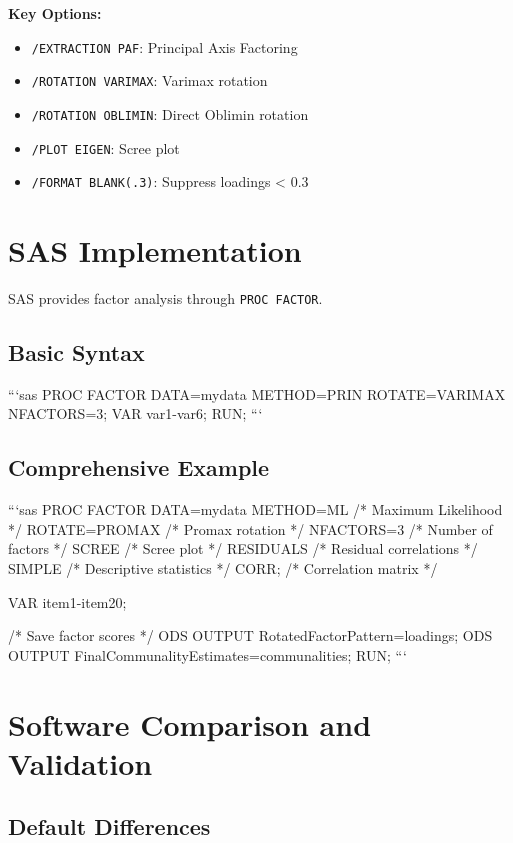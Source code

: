 \documentclass[a4paper]{tufte-book}
\begin{document}
\textbf{Key Options:}
\begin{itemize}
\item \texttt{/EXTRACTION PAF}: Principal Axis Factoring
\item \texttt{/ROTATION VARIMAX}: Varimax rotation
\item \texttt{/ROTATION OBLIMIN}: Direct Oblimin rotation
\item \texttt{/PLOT EIGEN}: Scree plot
\item \texttt{/FORMAT BLANK(.3)}: Suppress loadings < 0.3
\end{itemize}

\section{SAS Implementation}

SAS provides factor analysis through \texttt{PROC FACTOR}.

\subsection{Basic Syntax}

```sas
PROC FACTOR DATA=mydata METHOD=PRIN ROTATE=VARIMAX NFACTORS=3;
  VAR var1-var6;
  RUN;
```

\subsection{Comprehensive Example}

```sas
PROC FACTOR DATA=mydata 
    METHOD=ML          /* Maximum Likelihood */
    ROTATE=PROMAX      /* Promax rotation */
    NFACTORS=3         /* Number of factors */
    SCREE              /* Scree plot */
    RESIDUALS          /* Residual correlations */
    SIMPLE             /* Descriptive statistics */
    CORR;              /* Correlation matrix */
    
  VAR item1-item20;
  
  /* Save factor scores */
  ODS OUTPUT RotatedFactorPattern=loadings;
  ODS OUTPUT FinalCommunalityEstimates=communalities;
RUN;
```

\section{Software Comparison and Validation}

\subsection{Default Differences}
\end{document}
